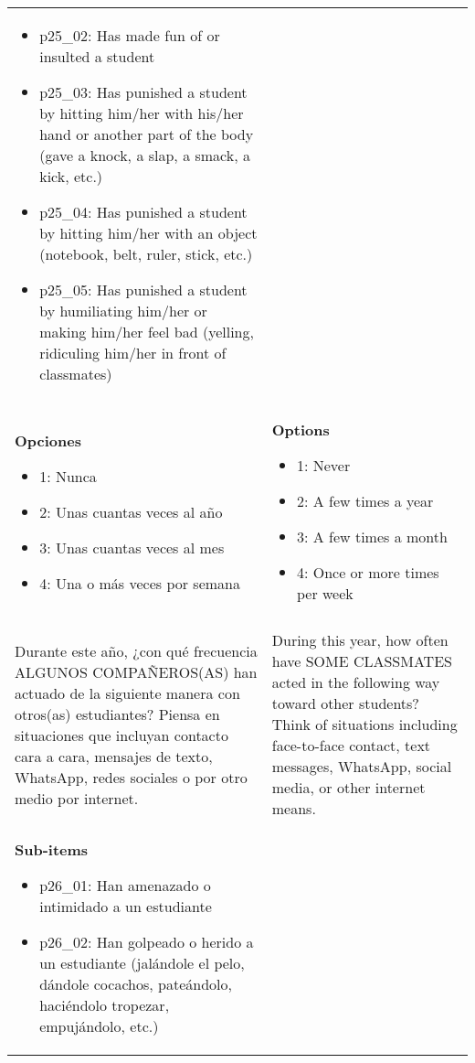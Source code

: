 \documentclass[11pt]{article}
\begin{document}
\begin{longtable}{@{}LL@{}}
\begin{itemize}[leftmargin=*]
\item p25\_02: Has made fun of or insulted a student
\item p25\_03: Has punished a student by hitting him/her with his/her hand or another part of the body (gave a knock, a slap, a smack, a kick, etc.)
\item p25\_04: Has punished a student by hitting him/her with an object (notebook, belt, ruler, stick, etc.)
\item p25\_05: Has punished a student by humiliating him/her or making him/her feel bad (yelling, ridiculing him/her in front of classmates)\end{itemize} \\
\textbf{Opciones}\par\begin{itemize}[leftmargin=*]\item 1: Nunca
\item 2: Unas cuantas veces al año
\item 3: Unas cuantas veces al mes
\item 4: Una o más veces por semana\end{itemize} & \textbf{Options}\par\begin{itemize}[leftmargin=*]\item 1: Never
\item 2: A few times a year
\item 3: A few times a month
\item 4: Once or more times per week\end{itemize} \\
\addlinespace[4pt]
 \\ 
Durante este año, ¿con qué frecuencia ALGUNOS COMPAÑEROS(AS) han actuado de la siguiente manera con otros(as) estudiantes? Piensa en situaciones que incluyan contacto cara a cara, mensajes de texto, WhatsApp, redes sociales o por otro medio por internet. & During this year, how often have SOME CLASSMATES acted in the following way toward other students? Think of situations including face-to-face contact, text messages, WhatsApp, social media, or other internet means. \\
\textbf{Sub-items}\par\begin{itemize}[leftmargin=*]\item p26\_01: Han amenazado o intimidado a un estudiante
\item p26\_02: Han golpeado o herido a un estudiante (jalándole el pelo, dándole cocachos, pateándolo, haciéndolo tropezar, empujándolo, etc.)

\end{itemize}
\end{longtable}
\end{document}
